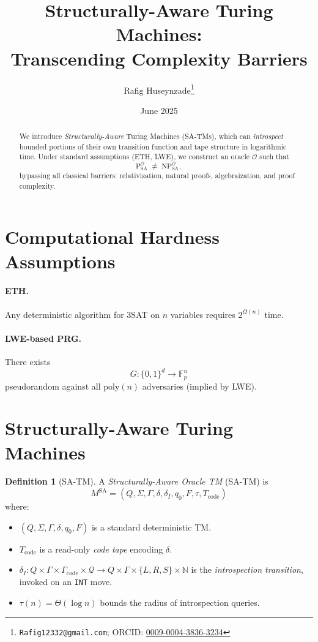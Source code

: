 \documentclass[12pt]{article}
\newcommand{\classP}{\mathrm{P}}
\newcommand{\classNP}{\mathrm{NP}}
\newcommand{\SA}{\mathrm{SA}}
\newcommand{\OO}{\mathcal{O}}
\newcommand{\F}{\mathbb{F}}
\newcommand{\poly}{\mathrm{poly}}
\newcommand{\code}{\mathrm{code}}
\theoremstyle{definition}
\newtheorem{definition}{Definition}[section]
\theoremstyle{plain}
\begin{document}
\title{Structurally-Aware Turing Machines:\\Transcending Complexity Barriers}
\author{Rafig Huseynzade\thanks{\texttt{Rafig12332@gmail.com}; ORCID: \href{https://orcid.org/0009-0004-3836-3234}{0009-0004-3836-3234}}}
\date{June 2025}
\maketitle

\begin{abstract}
We introduce \emph{Structurally-Aware} Turing Machines (SA-TMs), which can \emph{introspect} bounded
portions of their own transition function and tape structure in logarithmic time.
Under standard assumptions (ETH, LWE), we construct an oracle \(\OO\) such that
\[
  \classP^{\OO}_{\SA} \;\neq\; \classNP^{\OO}_{\SA},
\]
bypassing all classical barriers: relativization, natural proofs, algebraization, and proof complexity.
\end{abstract}

\section{Computational Hardness Assumptions}
\paragraph{ETH.}
Any deterministic algorithm for 3SAT on \(n\) variables requires \(2^{\Omega(n)}\) time.

\paragraph{LWE-based PRG.}
There exists
\[
  G\colon\{0,1\}^d\to\F_p^n
\]
pseudorandom against all \(\poly(n)\) adversaries (implied by LWE).

\section{Structurally-Aware Turing Machines}

\begin{definition}[SA-TM]\label{def:satm}
A \emph{Structurally-Aware Oracle TM} (SA-TM) is
\[
  M^{\SA}=(Q,\Sigma,\Gamma,\delta,\delta_I,q_0,F,\tau,T_{\code})
\]
where:
\begin{itemize}
  \item \((Q,\Sigma,\Gamma,\delta,q_0,F)\) is a standard deterministic TM.
  \item \(T_{\code}\) is a read-only \emph{code tape} encoding \(\delta\).
  \item \(\delta_I\colon Q\times\Gamma\times\Gamma_{\code}\times\mathcal{Q}
    \to Q\times\Gamma\times\{L,R,S\}\times\mathbb{N}\) is the \emph{introspection transition},
    invoked on an \texttt{INT} move.
  \item \(\tau(n)=\Theta(\log n)\) bounds the radius of introspection queries.
\end{itemize}
\end{definition}
\end{document}
